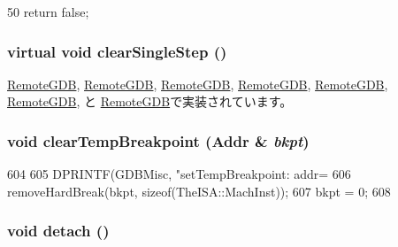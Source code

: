 \begin{DoxyCode}
50 { return false; }
\end{DoxyCode}
\hypertarget{classBaseRemoteGDB_a69f1887d1310ab6f19cf5bbcdf9d7a1e}{
\subsubsection[{clearSingleStep}]{\setlength{\rightskip}{0pt plus 5cm}virtual void clearSingleStep ()}}
\label{classBaseRemoteGDB_a69f1887d1310ab6f19cf5bbcdf9d7a1e}


\hyperlink{classAlphaISA_1_1RemoteGDB_afd89268069d9026378b06b08c97f65f8}{RemoteGDB}, \hyperlink{classArmISA_1_1RemoteGDB_afd89268069d9026378b06b08c97f65f8}{RemoteGDB}, \hyperlink{classMipsISA_1_1RemoteGDB_afd89268069d9026378b06b08c97f65f8}{RemoteGDB}, \hyperlink{classMipsISA_1_1RemoteGDB_afd89268069d9026378b06b08c97f65f8}{RemoteGDB}, \hyperlink{classPowerISA_1_1RemoteGDB_afd89268069d9026378b06b08c97f65f8}{RemoteGDB}, \hyperlink{classSparcISA_1_1RemoteGDB_afd89268069d9026378b06b08c97f65f8}{RemoteGDB}, と \hyperlink{classX86ISA_1_1RemoteGDB_afd89268069d9026378b06b08c97f65f8}{RemoteGDB}で実装されています。\hypertarget{classBaseRemoteGDB_a93ff11d3bfcc225314165f7b416ec0eb}{
\subsubsection[{clearTempBreakpoint}]{\setlength{\rightskip}{0pt plus 5cm}void clearTempBreakpoint ({\bf Addr} \& {\em bkpt})}}
\label{classBaseRemoteGDB_a93ff11d3bfcc225314165f7b416ec0eb}



\begin{DoxyCode}
604 {
605     DPRINTF(GDBMisc, "setTempBreakpoint: addr=%
606     removeHardBreak(bkpt, sizeof(TheISA::MachInst));
607     bkpt = 0;
608 }
\end{DoxyCode}
\hypertarget{classBaseRemoteGDB_ac295bade8aee589f6718dfa79edc2a34}{
\subsubsection[{detach}]{\setlength{\rightskip}{0pt plus 5cm}void detach ()}}
\label{classBaseRemoteGDB_ac295bade8aee589f6718dfa79edc2a34}



